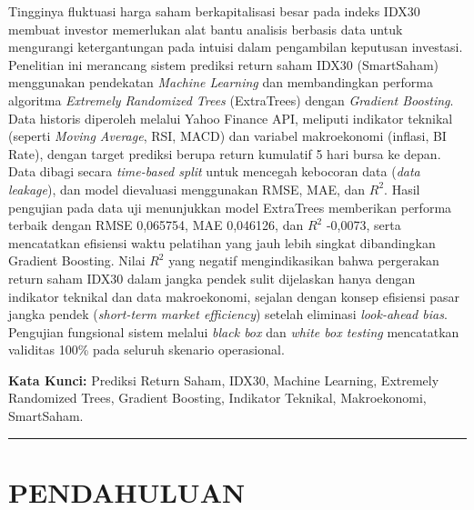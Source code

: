 \documentclass[10pt,a4paper]{article}
\begin{document}
{\fontsize{9.5pt}{12pt}\selectfont
Tingginya fluktuasi harga saham berkapitalisasi besar pada indeks IDX30 membuat investor memerlukan alat bantu analisis berbasis data untuk mengurangi ketergantungan pada intuisi dalam pengambilan keputusan investasi. Penelitian ini merancang sistem prediksi return saham IDX30 (SmartSaham) menggunakan pendekatan \textit{Machine Learning} dan membandingkan performa algoritma \textit{Extremely Randomized Trees} (ExtraTrees) dengan \textit{Gradient Boosting}. Data historis diperoleh melalui Yahoo Finance API, meliputi indikator teknikal (seperti \textit{Moving Average}, RSI, MACD) dan variabel makroekonomi (inflasi, BI Rate), dengan target prediksi berupa return kumulatif 5 hari bursa ke depan. Data dibagi secara \textit{time-based split} untuk mencegah kebocoran data (\textit{data leakage}), dan model dievaluasi menggunakan RMSE, MAE, dan $R^2$. Hasil pengujian pada data uji menunjukkan model ExtraTrees memberikan performa terbaik dengan RMSE 0,065754, MAE 0,046126, dan $R^2$ -0,0073, serta mencatatkan efisiensi waktu pelatihan yang jauh lebih singkat dibandingkan Gradient Boosting. Nilai $R^2$ yang negatif mengindikasikan bahwa pergerakan return saham IDX30 dalam jangka pendek sulit dijelaskan hanya dengan indikator teknikal dan data makroekonomi, sejalan dengan konsep efisiensi pasar jangka pendek (\textit{short-term market efficiency}) setelah eliminasi \textit{look-ahead bias}. Pengujian fungsional sistem melalui \textit{black box} dan \textit{white box testing} mencatatkan validitas 100\% pada seluruh skenario operasional.\par}

\vspace{4pt}
{\fontsize{9.5pt}{12pt}\selectfont\textbf{Kata Kunci:} Prediksi Return Saham, IDX30, Machine Learning, Extremely Randomized Trees, Gradient Boosting, Indikator Teknikal, Makroekonomi, SmartSaham.\par}

\vspace{3pt}
\noindent\rule{\textwidth}{0.4pt}
\vspace{4pt}

\section{PENDAHULUAN}
\end{document}
